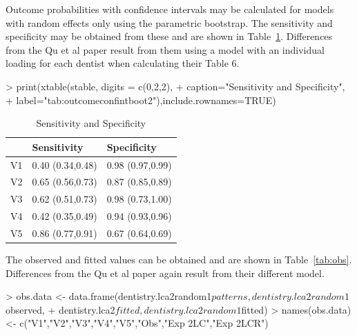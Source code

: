 Outcome probabilities with confidence intervals may be calculated for models with random effects only using the parametric bootstrap. The sensitivity and specificity may be obtained from these and are shown in Table~\ref{tab:outcomeconfintboot2}. Differences from the Qu et al paper result from them using a model with an individual loading for each dentist when calculating their Table 6.




\begin{Schunk}
\begin{Sinput}
> print(xtable(stable, digits = c(0,2,2),
+ 	caption="Sensitivity and Specificity",
+ 	label="tab:outcomeconfintboot2"),include.rownames=TRUE)
\end{Sinput}
\begin{table}[ht]
\centering
\begin{tabular}{rll}
  \hline
 & Sensitivity & Specificity \\ 
  \hline
V1 & 0.40 (0.34,0.48) & 0.98 (0.97,0.99) \\ 
  V2 & 0.65 (0.56,0.73) & 0.87 (0.85,0.89) \\ 
  V3 & 0.62 (0.51,0.73) & 0.98 (0.73,1.00) \\ 
  V4 & 0.42 (0.35,0.49) & 0.94 (0.93,0.96) \\ 
  V5 & 0.86 (0.77,0.91) & 0.67 (0.64,0.69) \\ 
   \hline
\end{tabular}
\caption{Sensitivity and Specificity} 
\label{tab:outcomeconfintboot2}
\end{table}\end{Schunk}

The observed and fitted values can be obtained and are shown in Table~\ref{tab:obs}. Differences from the Qu et al paper again result from their different model.

\begin{Schunk}
\begin{Sinput}
> obs.data <- data.frame(dentistry.lca2random1$patterns,dentistry.lca2random1$observed,
+ 	dentistry.lca2$fitted,dentistry.lca2random1$fitted)
> names(obs.data) <- c("V1","V2","V3","V4","V5","Obs","Exp 2LC","Exp 2LCR")
\end{Sinput}
\end{Schunk}



